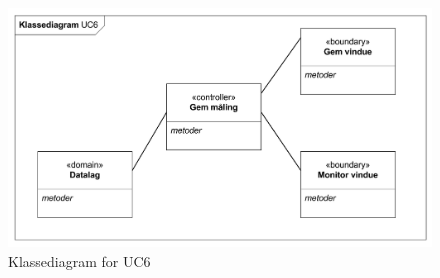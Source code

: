 \begin{figure}[H]
	\centering
	\includegraphics[width=1\textwidth]{Figurer/Snip20151102_20}
	\caption{Klassediagram for UC6}
\end{figure}












